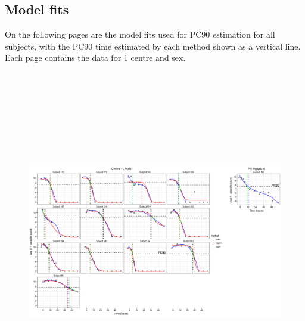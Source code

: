 \begin{singlespace}
\section{Model fits}\label{A:modelfits}
On the following pages are the model fits used for PC90 estimation for all subjects, with the PC90 time estimated by each method shown as a vertical line. Each page contains the data for 1 centre and sex.
\begin{figure}
\centering
\includegraphics[height=150mm]{Afits1M.eps}
\end{figure}
\begin{figure}
\centering

\end{figure}
\end{singlespace}

